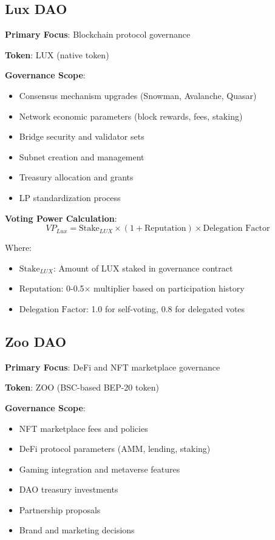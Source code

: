 \documentclass[11pt,a4paper]{article}
\begin{document}
\subsection{Lux DAO}

\textbf{Primary Focus}: Blockchain protocol governance

\textbf{Token}: LUX (native token)

\textbf{Governance Scope}:
\begin{itemize}
\item Consensus mechanism upgrades (Snowman, Avalanche, Quasar)
\item Network economic parameters (block rewards, fees, staking)
\item Bridge security and validator sets
\item Subnet creation and management
\item Treasury allocation and grants
\item LP standardization process
\end{itemize}

\textbf{Voting Power Calculation}:
\begin{equation}
VP_{Lux} = \text{Stake}_{LUX} \times (1 + \text{Reputation}) \times \text{Delegation Factor}
\end{equation}

Where:
\begin{itemize}
\item $\text{Stake}_{LUX}$: Amount of LUX staked in governance contract
\item $\text{Reputation}$: 0-0.5× multiplier based on participation history
\item $\text{Delegation Factor}$: 1.0 for self-voting, 0.8 for delegated votes
\end{itemize}

\subsection{Zoo DAO}

\textbf{Primary Focus}: DeFi and NFT marketplace governance

\textbf{Token}: ZOO (BSC-based BEP-20 token)

\textbf{Governance Scope}:
\begin{itemize}
\item NFT marketplace fees and policies
\item DeFi protocol parameters (AMM, lending, staking)
\item Gaming integration and metaverse features
\item DAO treasury investments
\item Partnership proposals
\item Brand and marketing decisions
\end{itemize}
\end{document}
